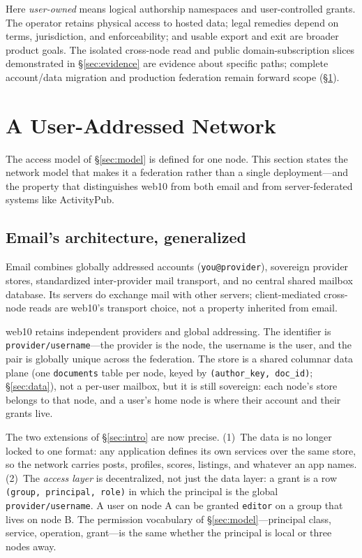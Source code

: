 \documentclass[sigconf, nonacm]{acmart}
\begin{document}
Here \emph{user-owned} means logical authorship namespaces and
user-controlled grants. The operator retains physical access to hosted data;
legal remedies depend on terms, jurisdiction, and enforceability; and usable
export and exit are broader product goals. The isolated cross-node read and
public domain-subscription slices demonstrated in \S\ref{sec:evidence} are
evidence about specific paths; complete account/data migration and
production federation remain forward scope (\S\ref{sec:network}).

\section{A User-Addressed Network}
\label{sec:network}

The access model of \S\ref{sec:model} is defined for one node. This section
states the network model that makes it a federation rather than a single
deployment---and the property that distinguishes web10 from both email and
from server-federated systems like ActivityPub.

\subsection{Email's architecture, generalized}

Email combines globally addressed accounts (\texttt{you@provider}), sovereign
provider stores, standardized inter-provider mail transport, and no central
shared mailbox database. Its servers do exchange mail with other servers;
client-mediated cross-node reads are web10's transport choice, not a property
inherited from email.

web10 retains independent providers and global addressing. The identifier is
\texttt{provider/username}---the provider is the node, the username is the
user, and the pair is globally unique across the federation. The store is a
shared columnar data plane (one \texttt{documents} table per node, keyed by
\texttt{(author\_key, doc\_id)}; \S\ref{sec:data}), not a per-user mailbox,
but it is still sovereign: each node's store belongs to that node, and a
user's home node is where their account and their grants live.

The two extensions of \S\ref{sec:intro} are now precise. (1)~The data is no
longer locked to one format: any application defines its own services over
the same store, so the network carries posts, profiles, scores, listings,
and whatever an app names. (2)~The \emph{access layer} is decentralized, not
just the data layer: a grant is a row \texttt{(group, principal, role)} in
which the principal is the global \texttt{provider/username}. A user on node
A can be granted \texttt{editor} on a group that lives on node B. The
permission vocabulary of \S\ref{sec:model}---principal class, service,
operation, grant---is the same whether the principal is local or three nodes
away.
\end{document}
